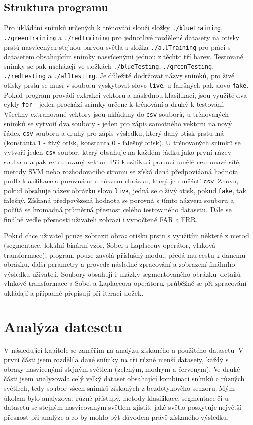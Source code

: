 \subsection{Struktura programu}
Pro ukládání snímků určených k trénování slouží složky \verb=./blueTraining=, \verb=./greenTraining= a \verb=./redTraining= pro jednotlivé rozdělené datasety na otisky prstů nasvícených stejnou barvou světla a složka \verb=./allTraining= pro práci s datasetem obsahujícím snímky nasvícenými jednou z těchto tří barev. Testované snímky se pak nacházejí ve složkách \verb=./blueTesting=, \verb=./greenTesting=, \verb=./redTesting= a \verb=./allTesting=. Je důležité dodržovat názvy snímků, pro živé otisky prstu se musí v souboru vyskytovat slovo \verb=live=, u falešných pak slovo \verb=fake=. Pokud program provádí extrakci vektorů a následnou klasifikaci, jsou využité dva cykly \verb=for= - jeden prochází snímky určené k trénování a druhý k testování. Všechny extrahované vektory jsou ukládány do \verb=csv= souborů, u trénovaných snímků se vytvoří dva soubory - jeden pro zápis samotného vektoru na nový řádek \verb=csv= souboru a druhý pro zápis výsledku, který daný otisk prstu má (konstanta 1 - živý otisk, konstanta 0 - falešný otisk). U trénovaných snímků se vytvoří jeden \verb=csv= soubor, který obsahuje na každém řádku jako první název souboru a pak extrahovaný vektor. Při klasifikaci pomocí umělé neuronové sítě, metody SVM nebo rozhodovacího stromu se získá daná předpovídaná hodnota podle klasifikace a porovná se s názvem obrázku, který je součástí \verb=csv=. Znovu, pokud obsahuje název obrázku slovo \verb=live=, jedná se o živý otisk, pokud \verb=fake=, tak falešný. Získaná předpovězená hodnota se porovná s tímto názvem souboru a počítá se hromadná průměrná přesnost celého testovaného datasetu. Dále se finálně vedle přesnosti uživateli zobrazí i vypočtené FAR a FRR. 

Pokud chce uživatel pouze zobrazit obraz otisku prstu s využitím některé z metod (segmentace, lokální binární vzor, Sobel a Laplaceův operátor, vlnková transformace), program pouze zavolá příslušný modul, předá mu cestu k danému obrázku, další parametry a provede následné zpracování a zobrazení finálního výsledku uživateli. Soubory obsahují i ukázky segmentovaného obrázku, detailů vlnkové transformace a Sobel a Laplaceova operátoru, průběžně se při zpracování ukládají a případně přepisují při iteraci složek.


\section{Analýza datesetu}
V následující kapitole se zaměřím na analýzu získaného a použitého datasetu. V první části jsem rozdělila dané snímky na tři různé menší datasety, každý s obrazy nasvícenými stejným světlem (zeleným, modrým a červeným). Ve druhé části jsem analyzovala celý velký dataset obsahující kombinaci snímků o různých světlech, tedy soubor všech snímků získaných z bezdotykového senzoru. Mým úkolem bylo analyzovat různé přístupy, metody klasifikace, segmentace či u datasetu se stejným nasvicovaným světlem zjistit, jaké světlo poskytuje největší přesnost při analýze a co by mohlo být důvodem právě získaného výsledku.

